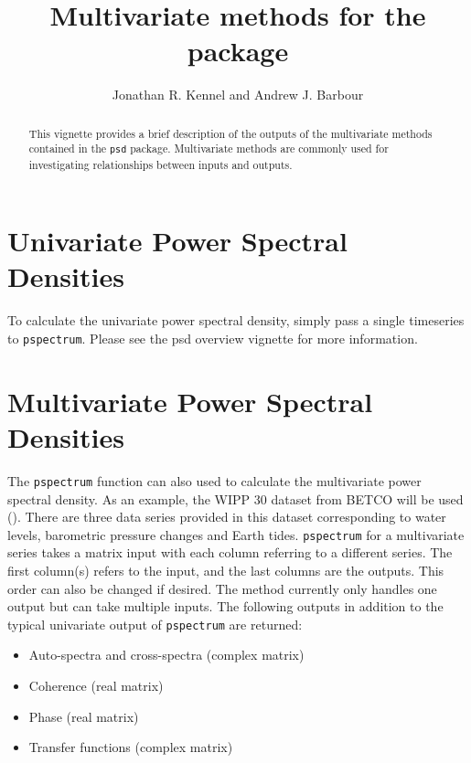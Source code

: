 \documentclass[11pt]{article}\usepackage[]{graphicx}\usepackage[]{xcolor}
\title{Multivariate methods for the \Rcmd{psd} package}
\author{Jonathan R. Kennel and Andrew J. Barbour}
\newcommand{\Rcmd}[1]{\texttt{#1}}
\begin{document}
\maketitle
%
\begin{abstract}
%
This vignette provides a brief description of the outputs of the multivariate methods contained in the \Rcmd{psd} package. Multivariate methods are commonly used for investigating relationships between inputs and outputs. 
%
\end{abstract}

\tableofcontents
\clearpage

\section{Univariate Power Spectral Densities}

To calculate the univariate power spectral density, simply pass a
single timeseries to \Rcmd{pspectrum}. Please see the psd overview vignette for more information.




\section{Multivariate Power Spectral Densities}

The \Rcmd{pspectrum} function can also used to calculate the multivariate power spectral density. 
As an example, the WIPP 30 dataset from BETCO will be used (\citet{Toll2007}). 
There are three data series provided in this dataset corresponding to water levels, 
barometric pressure changes and Earth tides.  \Rcmd{pspectrum} for a multivariate 
series takes a matrix input with each column referring to a different series. 
The first column(s) refers to the input, and the last columns are the outputs.  
This order can also be changed if desired.  The method currently only handles 
one output but can take multiple inputs.  The following outputs in addition 
to the typical univariate output of \Rcmd{pspectrum} are returned:

\begin{itemize}
\item Auto-spectra and cross-spectra (complex matrix)
\item Coherence (real matrix)
\item Phase (real matrix)
\item Transfer functions (complex matrix)
\end{itemize}
\end{document}
